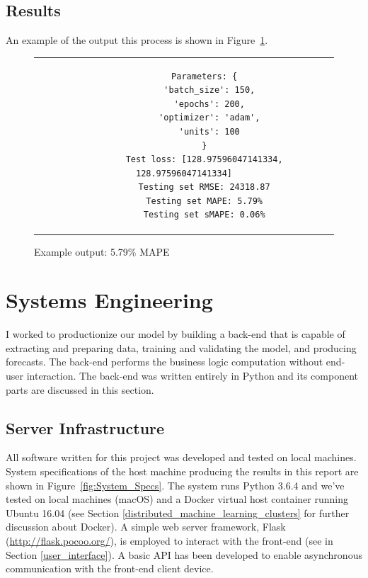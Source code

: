\documentclass[11pt, oneside]{article}
\begin{document}
\subsection{Results}
An example of the output this process is shown in Figure~\ref{fig:Example_Output}.

\begin{figure}[h]
  \caption{Example output: 5.79\% MAPE}
  \label{fig:Example_Output}
  \begin{center}
    \begin{tabular}{c}
      \begin{lstlisting}
        Parameters: {
          'batch_size': 150,
          'epochs': 200,
          'optimizer': 'adam',
          'units': 100
        }
        Test loss: [128.97596047141334, 128.97596047141334]
        Testing set RMSE: 24318.87
        Testing set MAPE: 5.79%
        Testing set sMAPE: 0.06%
      \end{lstlisting}
    \end{tabular}
  \end{center}
\end{figure}

\section{Systems Engineering}
I worked to productionize our model by building a back-end that is capable of extracting and preparing data, training and validating the model, and producing forecasts. The back-end performs the business logic computation without end-user interaction. The back-end was written entirely in Python and its component parts are discussed in this section.

\subsection{Server Infrastructure}
All software written for this project was developed and tested on local machines. System specifications of the host machine producing the results in this report are shown in Figure~\ref{fig:System_Specs}. The system runs Python 3.6.4 and we've tested on local machines (macOS) and a Docker virtual host container running Ubuntu 16.04 (see Section \ref{distributed_machine_learning_clusters} for further discussion about Docker). A simple web server framework, Flask (\url{http://flask.pocoo.org/}), is employed to interact with the front-end (see in Section \ref{user_interface}). A basic API has been developed to enable asynchronous communication with the front-end client device.
\end{document}

